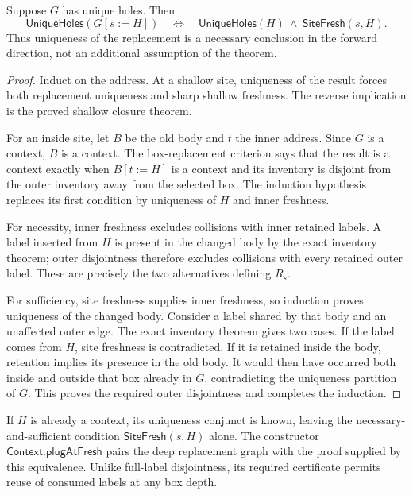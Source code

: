 \begin{theorem}
Suppose $G$ has unique holes. Then
\[
 \mathsf{UniqueHoles}(G[s:=H])
 \quad\Longleftrightarrow\quad
 \mathsf{UniqueHoles}(H)\ \land\ \mathsf{SiteFresh}(s,H).
\]
Thus uniqueness of the replacement is a necessary conclusion in the forward
direction, not an additional assumption of the theorem.
\end{theorem}
\begin{proof}
Induct on the address. At a shallow site, uniqueness of the result forces both
replacement uniqueness and sharp shallow freshness. The reverse implication is
the proved shallow closure theorem.

For an inside site, let $B$ be the old body and $t$ the inner address. Since $G$
is a context, $B$ is a context. The box-replacement criterion says that the
result is a context exactly when $B[t:=H]$ is a context and its inventory is
disjoint from the outer inventory away from the selected box. The induction
hypothesis replaces its first condition by uniqueness of $H$ and inner
freshness.

For necessity, inner freshness excludes collisions with inner retained labels.
A label inserted from $H$ is present in the changed body by the exact inventory
theorem; outer disjointness therefore excludes collisions with every retained
outer label. These are precisely the two alternatives defining $R_s$.

For sufficiency, site freshness supplies inner freshness, so induction proves
uniqueness of the changed body. Consider a label shared by that body and an
unaffected outer edge. The exact inventory theorem gives two cases. If the
label comes from $H$, site freshness is contradicted. If it is retained inside
the body, retention implies its presence in the old body. It would then have
occurred both inside and outside that box already in $G$, contradicting the
uniqueness partition of $G$. This proves the required outer disjointness and
completes the induction.
\end{proof}

If $H$ is already a context, its uniqueness conjunct is known, leaving the
necessary-and-sufficient condition $\mathsf{SiteFresh}(s,H)$ alone.
The constructor $\mathsf{Context.plugAtFresh}$ pairs the deep replacement graph
with the proof supplied by this equivalence. Unlike full-label disjointness,
its required certificate permits reuse of consumed labels at any box depth.

